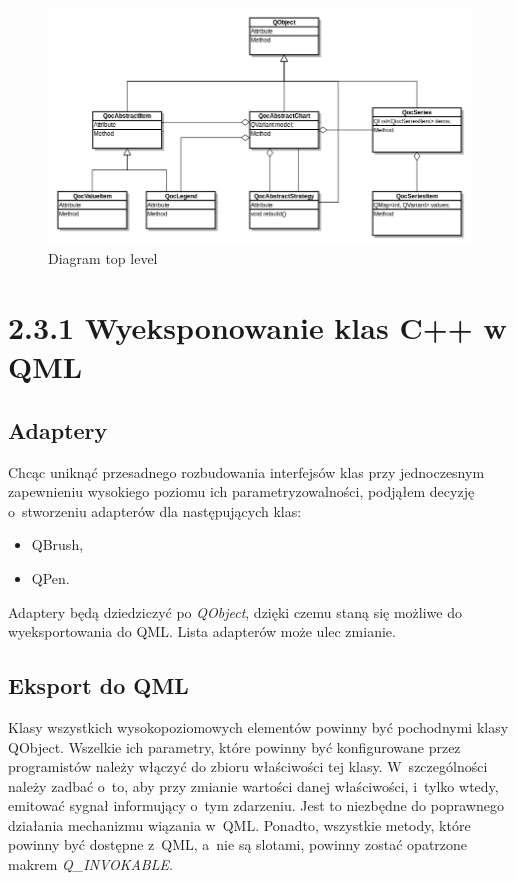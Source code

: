 \begin{figure}
\centering
\caption{Diagram top level}\label{rys:klasy:top_level}
\includegraphics[scale=0.4]{img/klasy-top_level.png}
\end{figure}


\section{2.3.1 Wyeksponowanie klas C++ w QML}
\subsection{Adaptery}
Chcąc uniknąć przesadnego rozbudowania interfejsów klas przy jednoczesnym zapewnieniu wysokiego poziomu ich parametryzowalności, podjąłem decyzję o~stworzeniu adapterów dla następujących klas:
\begin{itemize}  
\item{QBrush,}
\item{QPen.}
\end{itemize}
Adaptery będą dziedziczyć po \textit{QObject}, dzięki czemu staną się możliwe do wyeksportowania do QML. Lista adapterów może ulec zmianie.

\subsection{Eksport do QML}
Klasy wszystkich wysokopoziomowych elementów powinny być pochodnymi klasy QObject. Wszelkie ich parametry, które powinny być konfigurowane przez programistów należy włączyć do zbioru właściwości tej klasy. W~szczególności należy zadbać o~to, aby przy zmianie wartości danej właściwości, i~tylko wtedy, emitować sygnał informujący o~tym zdarzeniu. Jest to niezbędne do poprawnego działania mechanizmu wiązania w~QML. Ponadto, wszystkie metody, które powinny być dostępne z~QML, a~nie są slotami, powinny zostać opatrzone makrem \textit{Q\_INVOKABLE}.

